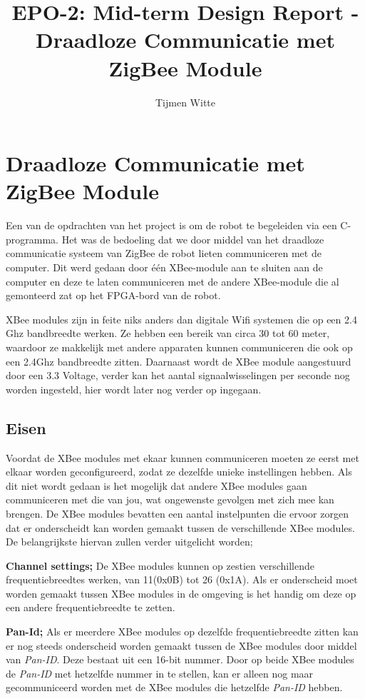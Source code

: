 \documentclass{report}
\title{EPO-2: Mid-term Design Report - Draadloze Communicatie met ZigBee Module}
\author{Tijmen Witte}
\begin{document}
\chapter{Draadloze Communicatie met ZigBee Module}

Een van de opdrachten van het project is om de robot te begeleiden via een C-programma. Het was de bedoeling dat we door middel van het draadloze communicatie systeem van ZigBee de robot lieten communiceren met de computer. Dit werd gedaan door één XBee-module aan te sluiten aan de computer en deze te laten communiceren met de andere XBee-module die al gemonteerd zat op het FPGA-bord van de robot.
\newline

XBee modules zijn in feite niks anders dan digitale Wifi systemen die op een 2.4 Ghz bandbreedte werken. Ze hebben een bereik van circa 30 tot 60 meter, waardoor ze makkelijk met andere apparaten kunnen communiceren die ook op een 2.4Ghz bandbreedte zitten. Daarnaast wordt de XBee module aangestuurd door een 3.3 Voltage, verder kan het aantal signaalwisselingen per seconde nog worden ingesteld, hier wordt later nog verder op ingegaan.
\newline

\section{Eisen}

Voordat de XBee modules met ekaar kunnen communiceren moeten ze eerst met elkaar worden geconfigureerd, zodat ze dezelfde unieke instellingen hebben. Als dit niet wordt gedaan is het mogelijk dat andere XBee modules gaan communiceren met die van jou, wat ongewenste gevolgen met zich mee kan brengen. 
\newline
De XBee modules bevatten een aantal instelpunten die ervoor zorgen dat er onderscheidt kan worden gemaakt tussen de verschillende XBee modules. De belangrijkste hiervan zullen verder uitgelicht worden;
\newline

\textbf{Channel settings;}
\newline
De XBee modules kunnen op zestien verschillende frequentiebreedtes werken, van 11(0x0B) tot 26 (0x1A). Als er onderscheid moet worden gemaakt tussen XBee modules in de omgeving is het handig om deze op een andere frequentiebreedte te zetten.
\newline

\textbf{Pan-Id;}
\newline
Als er meerdere XBee modules op dezelfde frequentiebreedte zitten kan er nog steeds onderscheid worden gemaakt tussen de XBee modules door middel van \textit{Pan-ID}. Deze bestaat uit een 16-bit nummer. Door op beide XBee modules de \textit{Pan-ID}  met hetzelfde nummer in te stellen, kan er alleen nog maar gecommuniceerd worden met de XBee modules die hetzelfde \textit{Pan-ID} hebben.
\newline
\end{document}
